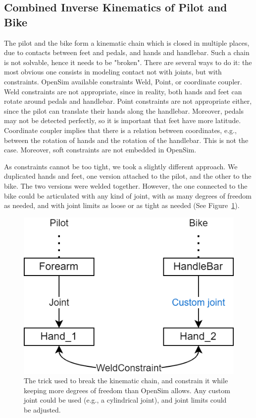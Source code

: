 \subsection{Combined Inverse Kinematics of Pilot and Bike}
The pilot and the bike form a kinematic chain which is closed in multiple places, due to contacts between feet and pedals, and hands and handlebar. Such a chain is not solvable, hence it needs to be "broken". There are several ways to do it: the most obvious one consists in modeling contact not with joints, but with constraints. OpenSim available constraints Weld, Point, or coordinate coupler. Weld constraints are not appropriate, since in reality, both hands and feet can rotate around pedals and handlebar. Point constraints are not appropriate either, since the pilot can translate their hands along the handlebar. Moreover, pedals may not be detected perfectly, so it is important that feet have more latitude. Coordinate coupler implies that there is a relation between coordinates, e.g., between the rotation of hands and the rotation of the handlebar. This is not the case. Moreover, soft constraints are not embedded in OpenSim. 

As constraints cannot be too tight, we took a slightly different approach. We duplicated hands and feet, one version attached to the pilot, and the other to the bike. The two versions were welded together. However, the one connected to the bike could be articulated with any kind of joint, with as many degrees of freedom as needed, and with joint limits as loose or as tight as needed (See Figure~\ref{fig_bikepilotchain}). 

\begin{figure}[hbtp]
	\centering
	\def\svgwidth{1\columnwidth}
	\fontsize{10pt}{10pt}\selectfont
	\includegraphics[width=0.4\linewidth]{"../Chap7/Figures/bikepilotChain.png"}
	\caption{The trick used to break the kinematic chain, and constrain it while keeping more degrees of freedom than OpenSim allows. Any custom joint could be used (e.g., a cylindrical joint), and joint limits could be adjusted.}
	\label{fig_bikepilotchain}
\end{figure}

